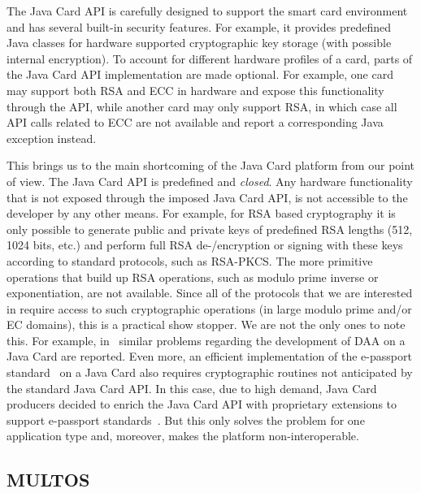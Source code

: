 
The Java Card API is carefully designed to support the smart card
environment and has several built-in security features. For example,
it provides predefined Java classes for hardware supported
cryptographic key storage (with possible internal encryption). To
account for different hardware profiles of a card, parts of the Java
Card API implementation are made optional. For example, one card may
support both RSA and ECC in hardware and expose this functionality
through the API, while another card may only support RSA, in which
case all API calls related to ECC are not available and report a
corresponding Java exception instead.

This brings us to the main shortcoming of the Java Card platform from our
point of view. The Java Card API is predefined
and \emph{closed}. Any hardware functionality that is not exposed
through the imposed Java Card API, is not accessible to the developer
by any other means. For example, for RSA based cryptography it is only
possible to generate public and private keys of predefined RSA lengths
(512, 1024 bits, etc.) and perform full RSA de-/encryption or signing
with these keys according to standard protocols, such as RSA-PKCS.  The
more primitive operations that build up RSA operations, such as modulo
prime inverse or exponentiation, are not available. Since all of the
protocols that we are interested in require access to such cryptographic operations
(in large modulo prime and/or EC domains), this is a practical show
stopper. We are not the only ones to note this. For example,
in~\cite{Sterckx09}
similar problems regarding the development of DAA on a Java Card are
reported.  Even more, an efficient implementation of the e-passport
standard~\cite{EAC20} on a Java Card also requires cryptographic
routines not anticipated by the standard Java Card API. In this case,
due to high demand, Java Card producers decided to enrich the Java
Card API with proprietary extensions to support e-passport
standards~\cite{NXP09}. But this only solves the problem for one
application type and, moreover, makes the platform non-interoperable.

\subsection{MULTOS}\label{sec:multos}

